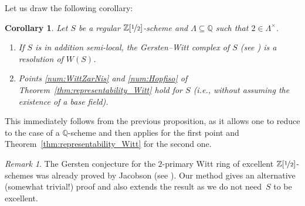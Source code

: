 \documentclass[11pt]{article}
\newcommand{\ie}{i.e.,\xspace}
\numberwithin{equation}{section}\renewcommand{\encodingdefault}{TU}
\newcommand{\ZZot} {\mathbb Z[\nicefrac 1 2]}
\newcommand{\QQ} {\mathbb Q}
\newtheorem{cor}[thm]{Corollary}
\theoremstyle{remark}
\newtheorem{rem}[thm]{Remark}
\theoremstyle{definition}
\numberwithin{equation}{thm}
\begin{document}
Let us draw the following corollary:
\begin{cor}\label{cor:Gersten--Witt_conj}
Let $S$ be a regular $\ZZot$-scheme and $\Lambda \subseteq \QQ$
such that $2 \in \Lambda^\times$.
\begin{enumerate}
\item If $S$ is in addition semi-local,
the Gersten--Witt complex of $S$ (see \cite{BalmerWalter}) is a resolution of $W(S)$.
\item Points \eqref{num:WittZarNis} and \eqref{num:Hopfiso} of Theorem~\ref{thm:representability_Witt}
hold for $S$ (\ie without assuming the existence of a base field).
\end{enumerate}
\end{cor}
This immediately follows from the previous proposition,
as it allows one to reduce to the case of a $\QQ$-scheme and then applies
\cite[4.3]{BalmerWitt} for the first point and Theorem~\ref{thm:representability_Witt}
for the second one.

\begin{rem}\label{rem:Jacobson}
The Gersten conjecture for the $2$-primary Witt ring of excellent $\ZZot$-schemes
was already proved by Jacobson (see \cite[5.3]{Jacobson}).
Our method gives an alternative (somewhat trivial!) proof
and also extends the result as we do not need~$S$ to be excellent.
\end{rem}


\end{document}

